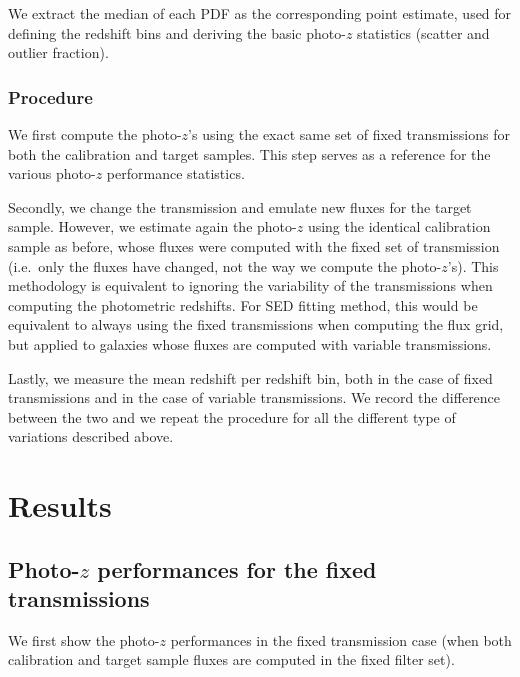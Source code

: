 \documentclass{article}
\begin{document}
We extract the median of each PDF as the corresponding point estimate,
used for defining the redshift bins and deriving the basic photo-\(z\)
statistics (scatter and outlier fraction).

\hypertarget{procedure}{%
\subsubsection{Procedure}\label{procedure}}

We first compute the photo-\(z\)'s using the exact same set of fixed
transmissions for both the calibration and target samples. This step
serves as a reference for the various photo-\(z\) performance
statistics.

Secondly, we change the transmission and emulate new fluxes for the
target sample. However, we estimate again the photo-\(z\) using the
identical calibration sample as before, whose fluxes were computed with
the fixed set of transmission (i.e.~only the fluxes have changed, not
the way we compute the photo-\(z\)'s). This methodology is equivalent to
ignoring the variability of the transmissions when computing the
photometric redshifts. For SED fitting method, this would be equivalent
to always using the fixed transmissions when computing the flux grid,
but applied to galaxies whose fluxes are computed with variable
transmissions.

Lastly, we measure the mean redshift per redshift bin, both in the case
of fixed transmissions and in the case of variable transmissions. We
record the difference between the two and we repeat the procedure for
all the different type of variations described above.


    \hypertarget{results}{%
\section{Results}\label{results}}

\hypertarget{photo-z-performances-for-the-fixed-transmissions}{%
\subsection{\texorpdfstring{Photo-\(z\) performances for the fixed
transmissions}{Photo-z performances for the fixed transmissions}}\label{photo-z-performances-for-the-fixed-transmissions}}

We first show the photo-\(z\) performances in the fixed transmission
case (when both calibration and target sample fluxes are computed in the
fixed filter set).
\end{document}

